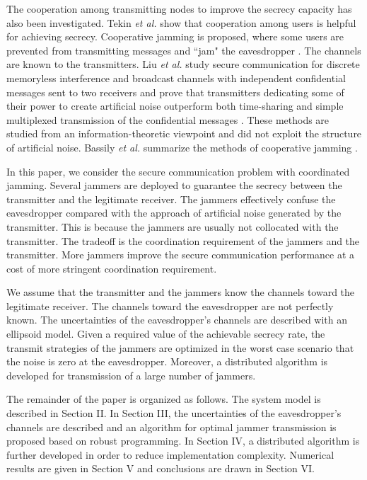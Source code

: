 \documentclass[conference]{IEEEtran}
\begin{document}
The cooperation among transmitting nodes to improve the secrecy capacity has also been investigated. Tekin \emph{et al.} show that cooperation among users is helpful for achieving secrecy. Cooperative jamming is proposed,  where some users are prevented from transmitting messages and ``jam" the eavesdropper \cite{tekin2008general}. The channels are known to the transmitters. Liu \emph{et al.} study secure communication for discrete memoryless interference and broadcast channels with independent confidential messages sent to two receivers and prove that transmitters dedicating some of their power to create artificial noise outperform both time-sharing and simple multiplexed transmission of the confidential messages \cite{liu2008discrete}. These methods are studied from an information-theoretic viewpoint and did not exploit the structure of artificial noise. Bassily \emph{et al.} summarize the methods of cooperative jamming \cite{cooperative_jamming}.


In this paper, we consider the secure communication problem with coordinated jamming.   Several jammers are deployed to guarantee the secrecy between the transmitter and the legitimate receiver.  The jammers effectively confuse the eavesdropper compared with the approach of artificial noise generated by the transmitter.  This is because the jammers are usually not collocated with the transmitter.  The tradeoff is the coordination requirement of the jammers and the transmitter.  More jammers improve the secure communication performance at a cost of more stringent coordination requirement. 

We assume that the transmitter and the jammers know the channels toward the legitimate receiver.  The channels toward the eavesdropper are not perfectly known.  The uncertainties of the eavesdropper’s channels are described with an ellipsoid model.   Given a required value of the achievable secrecy rate, the transmit strategies of the jammers are optimized in the worst case scenario that the noise is zero at the eavesdropper.  Moreover, a distributed algorithm is developed for transmission of a large number of jammers. 

The remainder of the paper is organized as follows.  The system model is described in Section II.  In Section III, the uncertainties of the eavesdropper’s channels are described and an algorithm for optimal jammer transmission is proposed based on robust programming.  In Section IV, a distributed algorithm is further developed in order to reduce implementation complexity.  Numerical results are given in Section V and conclusions are drawn in Section VI.
\end{document}
